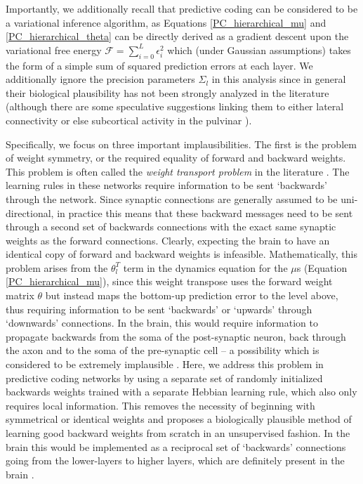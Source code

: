 Importantly, we additionally recall that predictive coding can be considered to be a variational inference algorithm, as Equations \ref{PC_hierarchical_mu} and \ref{PC_hierarchical_theta} can be directly derived as a gradient descent upon the variational free energy $\mathcal{F} = \sum_{i=0}^L \epsilon_i^2$ which (under Gaussian assumptions) takes the form of a simple sum of squared prediction errors at each layer. We additionally ignore the precision parameters $\Sigma_l$ in this analysis since in general their biological plausibility has not been strongly analyzed in the literature (although there are some speculative suggestions linking them to either lateral connectivity \citep{friston2005theory} or else subcortical activity in the pulvinar \citep{kanai2015cerebral}).

Specifically, we focus on three important implausibilities. The first is the problem of weight symmetry, or the required equality of forward and backward weights. This problem is often called the \emph{weight transport problem} in the literature \citep{lillicrap2016random,crick1989recent,lillicrap2020backpropagation}. The learning rules in these networks require information to be sent `backwards' through the network. Since synaptic connections are generally assumed to be uni-directional, in practice this means that these backward messages need to be sent through a second set of backwards connections with the exact same synaptic weights as the forward connections. Clearly, expecting the brain to have an identical copy of forward and backward weights is infeasible. Mathematically, this problem arises from the $\theta_l^T$ term in the dynamics equation for the $\mu$s (Equation \ref{PC_hierarchical_mu}), since this weight transpose uses the forward weight matrix $\theta$ but instead maps the bottom-up prediction error to the level above, thus requiring information to be sent `backwards' or `upwards' through `downwards' connections. In the brain, this would require information to propagate backwards from the soma of the post-synaptic neuron, back through the axon and to the soma of the pre-synaptic cell -- a possibility which is considered to be extremely implausible \citep{lillicrap2014random}. Here, we address this problem in predictive coding networks by using a separate set of randomly initialized backwards weights trained with a separate Hebbian learning rule, which also only requires local information. This removes the necessity of beginning with symmetrical or identical weights and proposes a biologically plausible method of learning good backward weights from scratch in an unsupervised fashion. In the brain this would be implemented as a reciprocal set of `backwards' connections going from the lower-layers to higher layers, which are definitely present in the brain \citep{grill2004human}.

